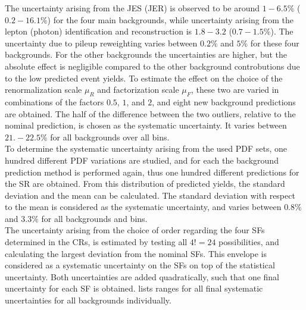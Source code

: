 The uncertainty arising from the JES (JER) is observed to be around $1-6.5\%$ ($0.2-16.1\%$) for the four main backgrounds, while uncertainty arising from the lepton (photon) identification and reconstruction is $1.8-3.2$ ($0.7-1.5\%$). The uncertainty due to pileup reweighting varies between $0.2\%$ and $5\%$ for these four backgrounds. For the other backgrounds the uncertainties are higher, but the absolute effect is negligible compared to the other background controbutions due to the low predicted event yields.
To estimate the effect on the choice of the renormalization scale $\mu_R$ and factorization scale $\mu_F$, these two are varied in combinations of the factors $0.5$, $1$, and $2$, and eight new background predictions are obtained. The half of the difference between the two outliers, relative to the nominal prediction, is chosen as the systematic uncertainty. It varies between $21.-22.5\%$ for all backgrounds over all bins.\\
To determine the systematic uncertainty arising from the used PDF sets, one hundred different PDF variations are studied, and for each the background prediction method is performed again, thus one hundred different predictions for the SR are obtained. From this distribution of predicted yields, the standard deviation and the mean can be calculated. The standard deviation with respect to the mean is considered as the systematic uncertainty, and varies between $0.8\%$ and $3.3\%$ for all backgrounds and bins.\\
The uncertainty arising from the choice of order regarding the four SFs determined in the CRs, is estimated by testing all $4!=24$ possibilities, and calculating the largest deviation from the nominal SFs. This envelope is considered as a systematic uncertainty on the SFs on top of the statistical uncertainty. Both uncertainties are added quadratically, such that one final uncertainty for each SF is obtained.
 lists ranges for all final systematic uncertainties for all backgrounds individually.
